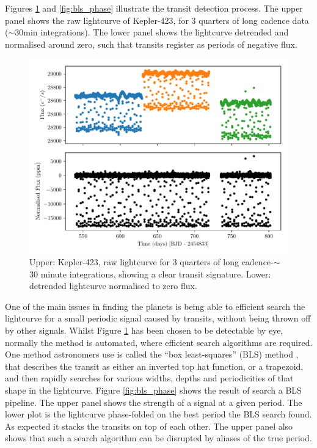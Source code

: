 Figures \ref{fig:tran_detrend} and \ref{fig:bls_phase} illustrate the transit detection process. The upper panel shows the raw lightcurve of Kepler-423, for 3 quarters of long cadence data (${\sim}30$min integrations). The lower panel shows the lightcurve detrended and normalised around zero, such that transits register as periods of negative flux. 
\begin{figure}[H]
\centering
\includegraphics[width=0.75\columnwidth]{Kep_423_tran_detrend.pdf}
\caption{Upper: Kepler-423, raw lightcurve for 3 quarters of long cadence-${\sim}$30 minute integrations, showing a clear transit signature. Lower: detrended lightcurve normalised to zero flux.}
\label{fig:tran_detrend}
\end{figure}
One of the main issues in finding the planets is being able to efficient search the lightcurve for a small periodic signal caused by transits, without being thrown off by other signals. Whilst Figure \ref{fig:tran_detrend} has been chosen to be detectable by eye, normally the method is automated, where efficient search algorithms are required. One method astronomers use is called the ``box least-squares'' (BLS) method \citep{BLS}, that describes the transit as either an inverted top hat function, or a trapezoid, and then rapidly searches for various widths, depths and periodicities of that shape in the lightcurve. 
Figure \ref{fig:bls_phase} shows the result of search a BLS pipeline. The upper panel shows the strength of a signal at a given period. The lower plot is the lightcurve phase-folded on the best period the BLS search found. As expected it stacks the transits on top of each other. The upper panel also shows that such a search algorithm can be disrupted by aliases of the true period. 
